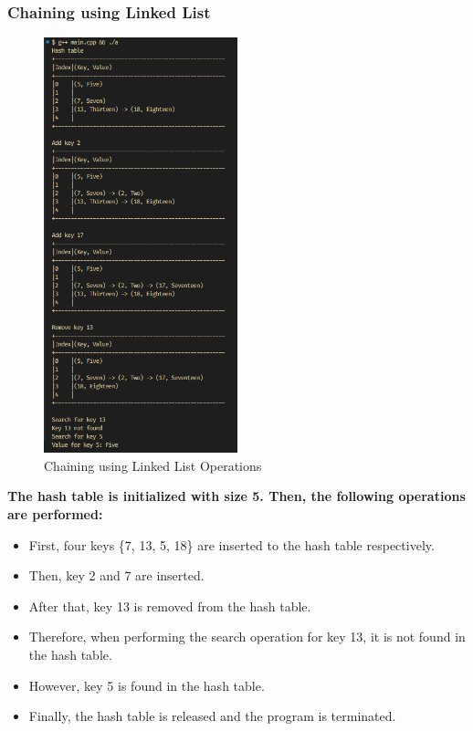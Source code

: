 \subsubsection*{Chaining using Linked List}
\begin{figure}[H]
	\centering
	\includegraphics[width=0.5\textwidth, height=0.65\textheight]{images/chaining_ll/main.png}
	\caption{Chaining using Linked List Operations}
\end{figure}
\textbf{The hash table is initialized with size 5. Then, the following operations are performed:}
\begin{itemize}
	\item First, four keys \{7, 13, 5, 18\} are inserted to the hash table respectively.
	\item Then, key 2 and 7 are inserted.
	\item After that, key 13 is removed from the hash table.
	\item Therefore, when performing the search operation for key 13, it is not found in the hash table.
	\item However, key 5 is found in the hash table.
	\item Finally, the hash table is released and the program is terminated.
\end{itemize}

